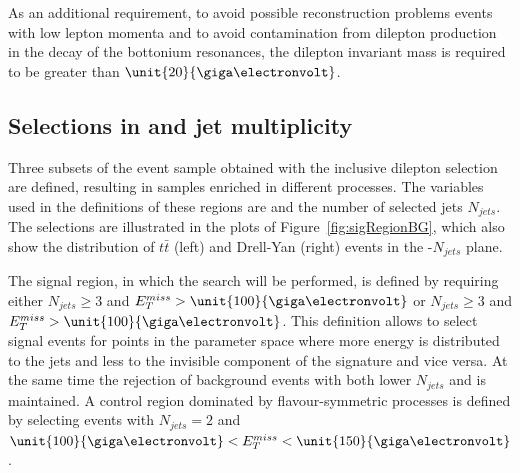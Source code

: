 As an additional requirement, to avoid possible reconstruction problems events with low lepton momenta and to avoid contamination from dilepton production in the decay of the bottonium resonances, the dilepton invariant mass \mll is required to be greater than $\unit{20}{\giga\electronvolt}$. 

\subsection{Selections in \MET and jet multiplicity}
Three subsets of the event sample obtained with the inclusive dilepton selection are defined, resulting in samples enriched in different processes. The variables used in the definitions of these regions are \MET and the number of selected jets $N_{jets}$. The selections are illustrated in the plots of Figure~\ref{fig:sigRegionBG}, which also show the distribution of $t\bar{t}$ (left) and Drell-Yan (right) events in the \MET-$N_{jets}$ plane. 
 
The signal region, in which the search will be performed, is defined by requiring either $N_{jets} \geq 3$ and $\MET > \unit{100}{\giga\electronvolt}$ or $N_{jets} \geq 3$ and $\MET > \unit{100}{\giga\electronvolt}$. This definition allows to select signal events for points in the parameter space where more energy is distributed to the jets and less to the invisible component of the signature and vice versa. At the same time the rejection of background events with both lower $N_{jets}$ and \MET is maintained. A control region dominated by flavour-symmetric processes is defined by selecting events with $N_{jets} = 2$ and $\unit{100}{\giga\electronvolt} < \MET < \unit{150}{\giga\electronvolt}$. 

